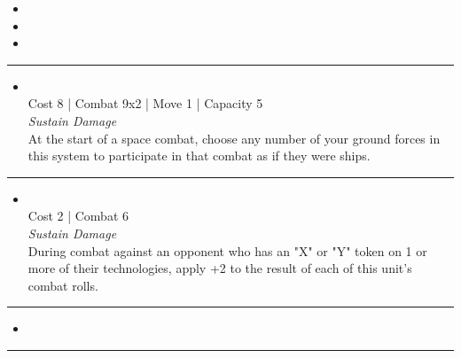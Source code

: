\begin{multicols}{2}

\begin{itemize}
\item \deaxive
\item {}
\item {}
\end{itemize}

\vspace{-10pt}\rule{\hsize}{0.4pt}\vspace{5pt}


\begin{itemize}
\item {}\\
Cost 8 | Combat 9x2 | Move 1 | Capacity 5 \\
\emph{Sustain Damage}\\
At the start of a space combat, choose any number of your ground forces in this system to participate in that combat as if they were ships.
\end{itemize}

\vspace{-10pt}\rule{\hsize}{0.4pt}\vspace{5pt}


\begin{itemize}
\item {}
\\
Cost 2 | Combat 6 \\
\emph{Sustain Damage}\\
During combat against an opponent who has an "X" or "Y" token on 1 or more of their technologies, apply +2 to the result of each of this unit's combat rolls.
\end{itemize}

\vspace{-10pt}\rule{\hsize}{0.4pt}\vspace{5pt}

\nounits

\columnbreak
{}

\begin{itemize}
\item \valefar
\end{itemize}

\vspace{-10pt}\rule{\hsize}{0.4pt}\vspace{5pt}


\end{multicols}
